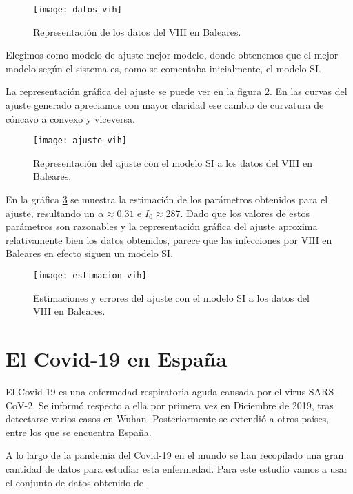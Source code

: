 \begin{figure}
\begin{center}
\caption{Representación de los datos del VIH en Baleares.}
\label{datos_vih}
\texttt{[image: datos\_vih]}
\end{center}
\end{figure}

Elegimos como modelo de ajuste mejor modelo, donde obtenemos que el mejor modelo según el sistema es, como se comentaba inicialmente, el modelo SI.

La representación gráfica del ajuste se puede ver en la figura \ref{ajuste_vih}. En las curvas del ajuste generado apreciamos con mayor claridad ese cambio de curvatura de cóncavo a convexo y viceversa. 

\begin{figure}
\begin{center}
\caption{Representación del ajuste con el modelo SI a los datos del VIH en Baleares.}
\label{ajuste_vih}
\texttt{[image: ajuste\_vih]}
\end{center}
\end{figure}

En  la gráfica \ref{estimacion_vih} se muestra la estimación de los parámetros obtenidos para el ajuste, resultando un $\alpha \approx 0.31$ e $I_0 \approx 287$. Dado que los valores de estos parámetros son razonables y la representación gráfica del ajuste aproxima relativamente bien los datos obtenidos, parece que las infecciones por VIH en Baleares en efecto siguen un modelo SI.

\begin{figure}
\begin{center}
\caption{Estimaciones y errores del ajuste con el modelo SI a los datos del VIH en Baleares.}
\label{estimacion_vih}
\texttt{[image: estimacion\_vih]}
\end{center}
\end{figure}

\section{El Covid-19 en España}

El Covid-19 es una enfermedad respiratoria aguda causada por el virus SARS-CoV-2. Se informó respecto a ella por primera vez en Diciembre de 2019, tras detectarse varios casos en Wuhan. Posteriormente se extendió a otros países, entre los que se encuentra España.

A lo largo de la pandemia del Covid-19 en el mundo se han recopilado una gran cantidad de datos para estudiar esta enfermedad. Para este estudio vamos a usar el conjunto de datos obtenido de \cite{datos_covid}.

